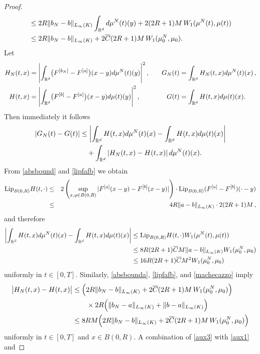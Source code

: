 \begin{proof}
\begin{align}
			&\leq 2R \| b_{N}-b\|_{L_\infty(K)}\int_{\mathbb{R}^d}d\mu^{N}(t)(y)+ 2(2R+1)M\,W_1(\mu^N(t),\mu(t))\\ \nonumber
			&\leq 2R \| b_{N}-b\|_{L_\infty(K)}+2 \overline{C}(2R+1)M\,W_1(\mu_0^N,\mu_0). 
	\end{align}
Let
	\begin{align*}
		H_N(t,x)&=\Biggl|\int_{\mathbb{R}^d}\bigl(F^{[b_{N}]}-F^{[a]}\bigr)(x-y)d\mu^{N}(t)(y)\Biggr|^2\,,\quad
		&G_N(t)&= \int_{\mathbb{R}^d}H_N(t,x)d\mu^N(t)(x)\,,\\
		H(t,x)&= \Biggl|\int_{\mathbb{R}^d}\bigl(F^{[b]}-F^{[a]}\bigr)(x-y)d\mu(t)(y)\Biggr|^2\,,
		&G(t)&= \int_{\mathbb{R}^d}H(t,x)d\mu(t)(x).
	\end{align*}
	Then immediately it follows
	\begin{align}
		|G_N(t)-G(t)|&\leq \left|\int_{\mathbb{R}^d}H(t,x)d\mu^N(t)(x) - \int_{\mathbb{R}^d}H(t,x)d\mu(t)(x)\right| \nonumber\\
		&\quad + \int_{\mathbb{R}^d}\left|H_N(t,x) - H(t,x)\right|d\mu^N(t)(x). \label{aux3}
	\end{align}
From \eqref{absbound} and \eqref{lipfafb} we obtain
\begin{eqnarray*}
\textup{Lip}_{B(0,R)}H(t,\cdot)&\leq& 2 \left (\sup_{x,y \in B(0,R)}|F^{[a]}(x-y)-F^{[b]}(x-y)| \right ) \cdot\textup{Lip}_{B(0,R)}(F^{[a]} -F^{[b]})(\cdot -y) \\
&\leq& 4R\|a-b\|_{L_\infty(K)}\cdot 2(2R+1)M\,,
\end{eqnarray*}
and therefore
	\begin{align}\label{aux1}
		\left|\int_{\mathbb{R}^d}H(t,x)d\mu^N(t)(x) - \int_{\mathbb{R}^d}H(t,x)d\mu(t)(x)\right|
			&\leq\textup{Lip}_{B(0,R)}H(t,\cdot)W_1(\mu^N(t),\mu(t))\nonumber\\
			&\leq 8R(2R+1)\overline{C}M\|a-b\|_{L_\infty(K)}W_1(\mu_0^N,\mu_0)\nonumber\\
			&\leq 16R(2R+1)\overline{C}M^2 W_1(\mu_0^N,\mu_0)
	\end{align}
	uniformly in $t \in [0,T]$. Similarly, \eqref{absbounda}, \eqref{lipfafb}, and \eqref{machecazzo} imply
	\begin{align}\label{aux2}
		\bigl|H_N(t,x)-H(t,x)\bigr|
			&\leq \Bigl(2R \| b_{N}-b\|_{L_\infty(K)}+2 \overline{C}(2R+1)M\,W_1(\mu_0^N,\mu_0)\Bigr)\nonumber\\
			&\qquad\times
				2R\Bigl(\|b_N-a\|_{L_\infty(K)}+\|b-a\|_{L_\infty(K)}\Bigr)\nonumber\\
			&\leq 8RM\Bigl(2R \| b_{N}-b\|_{L_\infty(K)}+2\overline{C}(2R+1)M\,W_1(\mu_0^N,\mu_0)\Bigr)
	\end{align}
	uniformly in $t \in [0,T]$ and $x \in B(0,R)$. A combination of \eqref{aux3} with \eqref{aux1} and

\end{proof}
